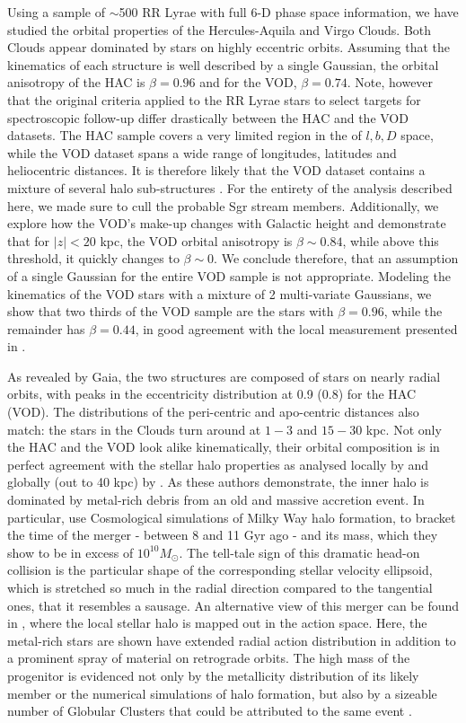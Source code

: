 \documentclass[fleqn,usenatbib]{mnras}
\begin{document}
Using a sample of $\sim$500 RR Lyrae with full 6-D phase space
information, we have studied the orbital properties of the
Hercules-Aquila and Virgo Clouds. Both Clouds appear dominated by
stars on highly eccentric orbits. Assuming that the kinematics of each
structure is well described by a single Gaussian, the orbital
anisotropy of the HAC is $\beta=0.96$ and for the VOD,
$\beta=0.74$. Note, however that the original criteria applied to the
RR Lyrae stars to select targets for spectroscopic follow-up differ
drastically between the HAC and the VOD datasets. The HAC sample
covers a very limited region in the of $l,b, D$ space, while the VOD
dataset spans a wide range of longitudes, latitudes and heliocentric
distances. It is therefore likely that the VOD dataset contains a
mixture of several halo sub-structures \citep[see][for a detailed
  discussion]{Vivas2016}. For the entirety of the analysis described
here, we made sure to cull the probable Sgr stream
members. Additionally, we explore how the VOD's make-up changes with
Galactic height and demonstrate that for $|z|<20$ kpc, the VOD orbital
anisotropy is $\beta\sim 0.84$, while above this threshold, it quickly
changes to $\beta\sim0$. We conclude therefore, that an assumption of
a single Gaussian for the entire VOD sample is not
appropriate. Modeling the kinematics of the VOD stars with a mixture
of 2 multi-variate Gaussians, we show that two thirds of the VOD
sample are the stars with $\beta=0.96$, while the remainder has
$\beta=0.44$, in good agreement with the local measurement presented
in \citet{Belokurov2018}.

As revealed by Gaia, the two structures are composed of stars on
nearly radial orbits, with peaks in the eccentricity distribution at
0.9 (0.8) for the HAC (VOD). The distributions of the peri-centric and
apo-centric distances also match: the stars in the Clouds turn around
at $1-3$ and $15-30$ kpc. Not only the HAC and the VOD look alike
kinematically, their orbital composition is in perfect agreement with
the stellar halo properties as analysed locally by
\citet{Belokurov2018} and globally (out to 40 kpc) by
\citet{Deason2018pileup}. As these authors demonstrate, the inner halo
is dominated by metal-rich debris from an old and massive accretion
event. In particular, \citet{Belokurov2018} use Cosmological
simulations of Milky Way halo formation, to bracket the time of the
merger - between 8 and 11 Gyr ago - and its mass, which they show to
be in excess of $10^{10} M_{\odot}$. The tell-tale sign of this
dramatic head-on collision is the particular shape of the
corresponding stellar velocity ellipsoid, which is stretched so much
in the radial direction compared to the tangential ones, that it
resembles a sausage. An alternative view of this merger can be found
in \citet{actionhalo}, where the local stellar halo is mapped out in
the action space. Here, the metal-rich stars are shown have extended
radial action distribution in addition to a prominent spray of
material on retrograde orbits. The high mass of the progenitor is
evidenced not only by the metallicity distribution of its likely
member or the numerical simulations of halo formation, but also by a
sizeable number of Globular Clusters that could be attributed to the
same event \citep[see][]{sausagegc}.
\end{document}
